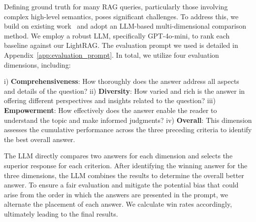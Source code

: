 \documentclass{article} %
\def\model{LightRAG}
\begin{document}
Defining ground truth for many RAG queries, particularly those involving complex high-level semantics, poses significant challenges. To address this, we build on existing work~\citep{edge2024local} and adopt an LLM-based multi-dimensional comparison method. We employ a robust LLM, specifically GPT-4o-mini, to rank each baseline against our \model. The evaluation prompt we used is detailed in Appendix~\ref{app:evaluation_prompt}. In total, we utilize four evaluation dimensions, including:

i) \textbf{Comprehensiveness}: How thoroughly does the answer address all aspects and details of the question? ii) \textbf{Diversity}: How varied and rich is the answer in offering different perspectives and insights related to the question? iii) \textbf{Empowerment}: How effectively does the answer enable the reader to understand the topic and make informed judgments? iv) \textbf{Overall}: This dimension assesses the cumulative performance across the three preceding criteria to identify the best overall answer.

The LLM directly compares two answers for each dimension and selects the superior response for each criterion. After identifying the winning answer for the three dimensions, the LLM combines the results to determine the overall better answer. To ensure a fair evaluation and mitigate the potential bias that could arise from the order in which the answers are presented in the prompt, we alternate the placement of each answer. We calculate win rates accordingly, ultimately leading to the final results. 
\end{document}
